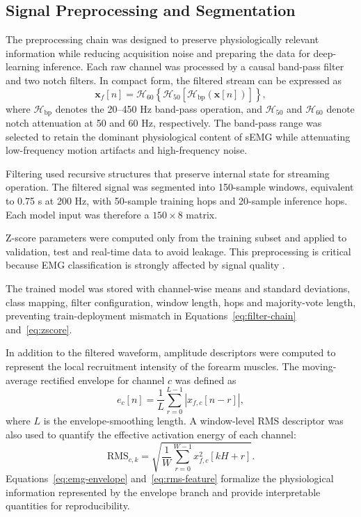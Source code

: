 \documentclass[technologies,article,submit,pdftex,moreauthors]{Definitions/mdpi}
\begin{document}
\subsection{Signal Preprocessing and Segmentation}

The preprocessing chain was designed to preserve physiologically relevant information while reducing acquisition noise and preparing the data for deep-learning inference. Each raw channel was processed by a causal band-pass filter and two notch filters. In compact form, the filtered stream can be expressed as
\begin{equation}
    \label{eq:filter-chain}
    \mathbf{x}_{f}[n]
    =
    \mathcal{H}_{60}
    \left\{
    \mathcal{H}_{50}
    \left[
    \mathcal{H}_{\mathrm{bp}}\left(\mathbf{x}[n]\right)
    \right]
    \right\},
\end{equation}
where $\mathcal{H}_{\mathrm{bp}}$ denotes the 20--450 Hz band-pass operation, and $\mathcal{H}_{50}$ and $\mathcal{H}_{60}$ denote notch attenuation at 50 and 60 Hz, respectively. The band-pass range was selected to retain the dominant physiological content of sEMG while attenuating low-frequency motion artifacts and high-frequency noise.

Filtering used recursive structures that preserve internal state for streaming operation. The filtered signal was segmented into 150-sample windows, equivalent to 0.75 s at 200 Hz, with 50-sample training hops and 20-sample inference hops. Each model input was therefore a $150 \times 8$ matrix.

Z-score parameters were computed only from the training subset and applied to validation, test and real-time data to avoid leakage. This preprocessing is critical because EMG classification is strongly affected by signal quality \cite{Phinyomark2012,Atzori2014SciData,NinaPro2015,Muceli2013,Prakash2021}.

The trained model was stored with channel-wise means and standard deviations, class mapping, filter configuration, window length, hops and majority-vote length, preventing train-deployment mismatch in Equations~\eqref{eq:filter-chain} and~\eqref{eq:zscore}.

In addition to the filtered waveform, amplitude descriptors were computed to represent the local recruitment intensity of the forearm muscles. The moving-average rectified envelope for channel $c$ was defined as
\begin{equation}
    \label{eq:emg-envelope}
    e_c[n]
    =
    \frac{1}{L}
    \sum_{r=0}^{L-1}
    \left|x_{f,c}[n-r]\right|,
\end{equation}
where $L$ is the envelope-smoothing length. A window-level RMS descriptor was also used to quantify the effective activation energy of each channel:
\begin{equation}
    \label{eq:rms-feature}
    \mathrm{RMS}_{c,k}
    =
    \sqrt{
    \frac{1}{W}
    \sum_{r=0}^{W-1}
    x_{f,c}^{2}[kH+r]
    }.
\end{equation}
Equations~\eqref{eq:emg-envelope} and~\eqref{eq:rms-feature} formalize the physiological information represented by the envelope branch and provide interpretable quantities for reproducibility.
\end{document}
